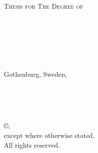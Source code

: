 
\thispagestyle{empty} %
\begin{center}
  \textsc{Thesis for The Degree of \degreetitle}\\
\end{center}

\vspace{4cm}

\begin{center} {\LARGE \textbf{\mytitle}}\\
\ifx\mysubtitle\undefined
\else
  \vspace{4mm}
  \textit{\large\mysubtitle}
\fi
\end{center}

\ifx\mysubtitle\undefined
\vspace{5mm}
\else
\vspace{2mm}
\fi

\begin{center}
\textsc{\large\authorname} \\
\end{center}

\vfill

\begin{center}
\textit{\mydepartment}\\
\textsc{\chalIgu}\\
Gothenburg, Sweden, \currentyear \\
\end{center}

\newpage
\thispagestyle{empty}

\vspace{2cm} \noindent \textbf
\mytitle\\
\ifx\mysubtitle\undefined
\else
  \textit{\small\mysubtitle}
  \\
\fi

\noindent
\textsc{\authorname}\\

\vskip 0.5cm\noindent
\copyright \space \authorname,~\currentyear  \\
\noindent
except where otherwise stated. \\
All rights reserved. \vspace{1cm}


